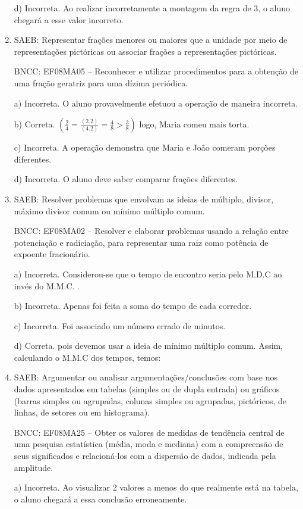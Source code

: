 \begin{enumerate}
d) Incorreta. Ao realizar incorretamente a montagem da
regra de 3, o aluno chegará a esse valor incorreto.

\item SAEB: Representar frações menores ou maiores que a unidade por meio de
representações pictóricas ou associar frações a representações
pictóricas.

BNCC: EF08MA05 -- Reconhecer e utilizar procedimentos para a obtenção de
uma fração geratriz para uma dízima periódica.

a) Incorreta. O aluno provavelmente efetuou a operação de maneira
incorreta.

b) Correta. 
$(\frac{2}{4} = \frac{(2 . 2)} {(4 . 2)} = \frac{4}{8} > \frac{3}{8})$
logo, Maria comeu mais torta.

c) Incorreta. A operação demonstra que Maria e João comeram porções
diferentes.

d) Incorreta. O aluno deve saber comparar frações diferentes.

\item SAEB: Resolver problemas que envolvam as ideias de múltiplo, divisor,
máximo divisor comum ou mínimo múltiplo comum.

BNCC: EF08MA02 -- Resolver e elaborar problemas usando a relação entre
potenciação e radiciação, para representar uma raiz como potência de
expoente fracionário.

a) Incorreta. Considerou-se que o tempo de encontro seria pelo M.D.C
ao invés do M.M.C. .

b) Incorreta. Apenas foi feita a soma do tempo de cada corredor.

c) Incorreta. Foi associado um número errado de minutos.

d) Correta. pois devemos usar a ideia de mínimo múltiplo comum. Assim,
calculando o M.M.C dos tempos, temos:

\item SAEB: Argumentar ou analisar argumentações/conclusões com base nos dados
apresentados em tabelas (simples ou de dupla entrada) ou gráficos
(barras simples ou agrupadas, colunas simples ou agrupadas, pictóricos,
de linhas, de setores ou em histograma).

BNCC: EF08MA25 -- Obter os valores de medidas de tendência central de
uma pesquisa estatística (média, moda e mediana) com a compreensão de
seus significados e relacioná-los com a dispersão de dados, indicada
pela amplitude.

a) Incorreta. Ao visualizar 2 valores a menos do que realmente
está na tabela, o aluno chegará a essa conclusão erroneamente.


\end{enumerate}
